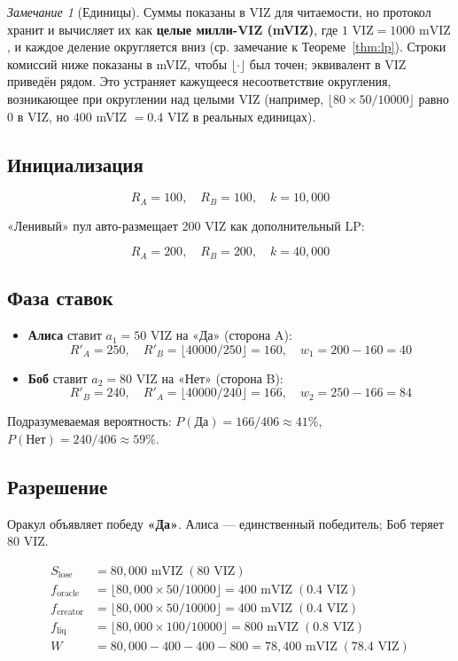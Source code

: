\documentclass{ledger}
\theoremstyle{plain}
\theoremstyle{remark}
\newtheorem*{remark}{Замечание}
\begin{document}
\begin{remark}[Единицы]
Суммы показаны в VIZ для читаемости, но протокол хранит и вычисляет их как
\textbf{целые милли-VIZ (mVIZ)}, где $1\text{ VIZ} = 1000\text{ mVIZ}$, и каждое
деление округляется вниз (ср. замечание к Теореме~\ref{thm:lp}). Строки комиссий
ниже показаны в mVIZ, чтобы $\lfloor\cdot\rfloor$ был точен; эквивалент в VIZ
приведён рядом. Это устраняет кажущееся несоответствие округления, возникающее при
округлении над целыми VIZ (например, $\lfloor 80\times 50/10000\rfloor$ равно $0$ в
VIZ, но $400$ mVIZ $=0.4$ VIZ в реальных единицах).
\end{remark}

\subsection{Инициализация}

\[
R_A = 100, \quad R_B = 100, \quad k = 10{,}000
\]

«Ленивый» пул авто-размещает 200 VIZ как дополнительный LP:

\[
R_A = 200, \quad R_B = 200, \quad k = 40{,}000
\]

\subsection{Фаза ставок}

\begin{itemize}
  \item \textbf{Алиса} ставит $a_1 = 50$ VIZ на «Да» (сторона A):
  \[
  R'_A = 250, \quad R'_B = \lfloor 40000/250 \rfloor = 160, \quad w_1 = 200 -
  160 = 40
  \]
  \item \textbf{Боб} ставит $a_2 = 80$ VIZ на «Нет» (сторона B):
  \[
  R'_B = 240, \quad R'_A = \lfloor 40000/240 \rfloor = 166, \quad w_2 = 250 -
  166 = 84
  \]
\end{itemize}

Подразумеваемая вероятность: $P(\text{Да}) = 166 / 406 \approx 41\%$, $P(\text{Нет}) =
240 / 406 \approx 59\%$.

\subsection{Разрешение}

Оракул объявляет победу \textbf{«Да»}. Алиса --- единственный победитель; Боб теряет
80 VIZ.

\begin{align*}
S_{\text{lose}} &= 80{,}000 \text{ mVIZ} \;(80 \text{ VIZ}) \\
f_{\text{oracle}} &= \lfloor 80{,}000 \times 50 / 10000 \rfloor = 400 \text{ mVIZ} \;(0.4 \text{ VIZ}) \\
f_{\text{creator}} &= \lfloor 80{,}000 \times 50 / 10000 \rfloor = 400 \text{ mVIZ} \;(0.4 \text{ VIZ}) \\
f_{\text{liq}} &= \lfloor 80{,}000 \times 100 / 10000 \rfloor = 800 \text{ mVIZ} \;(0.8 \text{ VIZ}) \\
W &= 80{,}000 - 400 - 400 - 800 = 78{,}400 \text{ mVIZ} \;(78.4 \text{ VIZ})
\end{align*}
\end{document}

